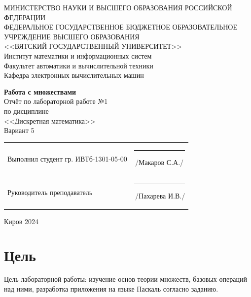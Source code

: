 \documentclass[a4paper,14pt]{extarticle}
\begin{document}
	\newpage\thispagestyle{empty}
	\begin{center}
		\MakeUppercase{
			Министерство науки и высшего образования Российской Федерации\\
			Федеральное государственное бюджетное образовательное учреждение высшего образования\\
			<<Вятский Государственный Университет>>\\
		}
		Институт математики и информационных систем\\
		Факультет автоматики и вычислительной техники\\
		Кафедра электронных вычислительных машин
	\end{center}
	\vfill
	
	\begin{center}
		\textbf{Работа с множествами}\\
		Отчёт по лабораторной работе №1\\
		по дисциплине\\
		<<Дискретная математика>>\\
		Вариант 5
	\end{center}
	\vfill
	
	\noindent
	\begin{tabular}{ll}
		Выполнил студент гр. ИВТб-1301-05-00 \hspace{5mm} &
		\rule[-1mm]{25mm}{0.10mm}\,/Макаров С.А./\\
		
		Руководитель преподаватель & \rule[-1mm]{25mm}{0.10mm}\,/Пахарева И.В./\\
	\end{tabular}
	
	\vfill
	\begin{center}
		Киров 2024
	\end{center}
	
	\newpage
	\section*{Цель}
	Цель лабораторной работы: изучение основ теории множеств, базовых операций над ними, разработка приложения на языке Паскаль согласно заданию.
	
\end{document}

